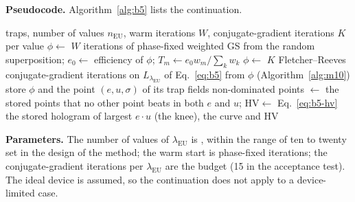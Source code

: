 \textbf{Pseudocode.} Algorithm~\ref{alg:b5} lists the continuation.

\begin{algorithm}[t]
\caption{Efficiency--uniformity continuation over $\lambda_{\mathrm{EU}}$, warm-started from the neighbouring value; the stored points are the non-dominated ones of the curve.}
\label{alg:b5}
\begin{algorithmic}[1]
\Require traps, number of values $n_{\mathrm{EU}}$, warm iterations $W$, conjugate-gradient iterations $K$ per value
\State $\phi\gets$ $W$ iterations of phase-fixed weighted GS from the random superposition; $e_0\gets$ efficiency of $\phi$; $T_m\gets e_0w_m/\sum_kw_k$
  \State $\phi\gets$ $K$ Fletcher--Reeves conjugate-gradient iterations on $L_{\lambda_{\mathrm{EU}}}$ of Eq.~\eqref{eq:b5} from $\phi$ (Algorithm~\ref{alg:m10})
  \State store $\phi$ and the point $(e,u,\sigma)$ of its trap fields
\EndFor
\State non-dominated points $\gets$ the stored points that no other point beats in both $e$ and $u$; $\mathrm{HV}\gets$ Eq.~\eqref{eq:b5-hv}
\State \Return the stored hologram of largest $e\cdot u$ (the knee), the curve and $\mathrm{HV}$
\end{algorithmic}
\end{algorithm}

\textbf{Parameters.} The number of values of $\lambda_{\mathrm{EU}}$ is , within the range of ten to twenty set in the design of the method; the warm start is  phase-fixed iterations; the conjugate-gradient iterations per $\lambda_{\mathrm{EU}}$ are the budget (15 in the acceptance test). The ideal device is assumed, so the continuation does not apply to a device-limited case.


